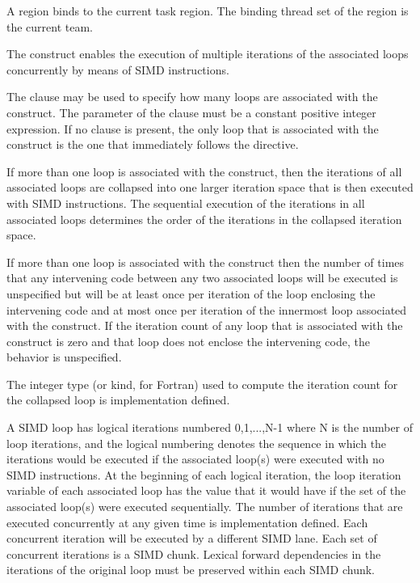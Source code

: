 \binding
A  region binds to the current task region. The binding thread set 
of the  region is the current team.

\descr
The  construct enables the execution of multiple iterations of the 
associated loops concurrently by means of SIMD instructions.

The  clause may be used to specify how many loops are associated 
with the construct. The parameter of the  clause must be a constant 
positive integer expression. If no  clause is present, the only 
loop that is associated with the  construct is the one that immediately 
follows the directive.

If more than one loop is associated with the  construct, then the 
iterations of all associated loops are collapsed into one larger iteration space 
that is then executed with SIMD instructions. The sequential execution of the 
iterations in all associated loops determines the order of the iterations in 
the collapsed iteration space.

If more than one loop is associated with the  construct
then the number of times that any intervening code between any two
associated loops will be executed is unspecified but will be at least
once per iteration of the loop enclosing the intervening code and at
most once per iteration of the innermost loop associated with the
construct.  If the iteration count of any loop that is associated with 
the  construct is zero and that loop does not enclose the 
intervening code, the behavior is unspecified.

The integer type (or kind, for Fortran) used to compute the iteration 
count for the collapsed loop is implementation defined.

A SIMD loop has logical iterations numbered 0,1,...,N-1 where N is the
number of loop iterations, and the logical numbering denotes the
sequence in which the iterations would be executed if the associated
loop(s) were executed with no SIMD instructions.  At the beginning of
each logical iteration, the loop iteration variable of each associated
loop has the value that it would have if the set of the associated
loop(s) were executed sequentially. The number of iterations that are
executed concurrently at any given time is implementation defined.
Each concurrent iteration will be executed by a different SIMD lane.
Each set of concurrent iterations is a SIMD chunk.  Lexical forward
dependencies in the iterations of the original loop must be preserved
within each SIMD chunk.


